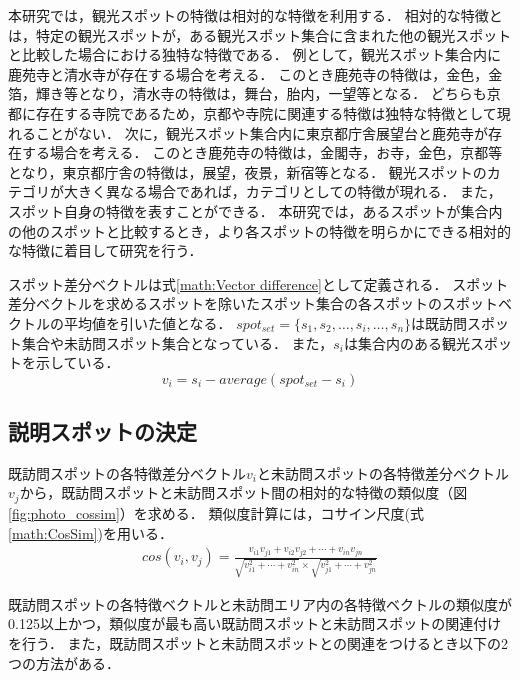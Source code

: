 \documentclass{deimj}
\begin{document}
本研究では，観光スポットの特徴は相対的な特徴を利用する．
相対的な特徴とは，特定の観光スポットが，ある観光スポット集合に含まれた他の観光スポットと比較した場合における独特な特徴である．
例として，観光スポット集合内に鹿苑寺と清水寺が存在する場合を考える．
このとき鹿苑寺の特徴は，金色，金箔，輝き等となり，清水寺の特徴は，舞台，胎内，一望等となる．
どちらも京都に存在する寺院であるため，京都や寺院に関連する特徴は独特な特徴として現れることがない．
次に，観光スポット集合内に東京都庁舎展望台と鹿苑寺が存在する場合を考える．
このとき鹿苑寺の特徴は，金閣寺，お寺，金色，京都等となり，東京都庁舎の特徴は，展望，夜景，新宿等となる．
観光スポットのカテゴリが大きく異なる場合であれば，カテゴリとしての特徴が現れる．
また，スポット自身の特徴を表すことができる．
本研究では，あるスポットが集合内の他のスポットと比較するとき，より各スポットの特徴を明らかにできる相対的な特徴に着目して研究を行う．

スポット差分ベクトルは式\ref{math:Vector difference}として定義される．
スポット差分ベクトルを求めるスポットを除いたスポット集合の各スポットのスポットベクトルの平均値を引いた値となる．
$spot_{set} =\{s_1,s_2,\dots,s_i,\dots,s_n\}$は既訪問スポット集合や未訪問スポット集合となっている．
また，$s_i$は集合内のある観光スポットを示している．
\begin{equation}
  v_i=s_i-average(spot_{set}-s_i)
    \label{math:Vector difference}
\end{equation}


\subsection{説明スポットの決定}
\label{subsec:説明スポットの決定}

既訪問スポットの各特徴差分ベクトル$v_i$と未訪問スポットの各特徴差分ベクトル$v_j$から，既訪問スポットと未訪問スポット間の相対的な特徴の類似度（図\ref{fig:photo_cossim}）を求める．
類似度計算には，コサイン尺度(式\ref{math:CosSim})を用いる．
\begin{eqnarray}
cos(v_i,v_j)=\frac{v_{i1}v_{j1}+v_{i2}v_{j2}+\cdots+v_{in}v_{jn}}
{\sqrt{v^2_{i1}+\cdots+v^2_{in}}\times\sqrt{v^2_{j1}+\cdots+v^2_{jn}}}
\label{math:CosSim}
\end{eqnarray}

既訪問スポットの各特徴ベクトルと未訪問エリア内の各特徴ベクトルの類似度が0.125以上かつ，類似度が最も高い既訪問スポットと未訪問スポットの関連付けを行う．
また，既訪問スポットと未訪問スポットとの関連をつけるとき以下の2つの方法がある．
\end{document}
